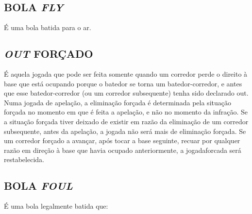 \subsection{BOLA \textit{FLY}}

 É uma bola batida para o ar.

\subsection{\textit{OUT} FORÇADO}

É aquela jogada que pode ser feita somente quando um corredor perde o direito à base que está ocupando porque o batedor se torna um batedor-corredor, e  antes que esse batedor-corredor (ou um corredor subsequente) tenha sido declarado \gls{out}. Numa jogada de apelação, a eliminação forçada é determinada pela situação forçada no momento em que é feita a apelação, e não no momento da infração. Se a situação forçada tiver deixado de existir em razão da eliminação de um corredor subsequente, antes da apelação, a jogada não será mais de eliminação forçada. Se um corredor forçado a avançar, após tocar a base seguinte, recuar por qualquer razão em direção à base que havia ocupado anteriormente, a \gls{jogadaforcada} será restabelecida.

\subsection{BOLA \textit{FOUL}}
 É uma bola legalmente batida que:

